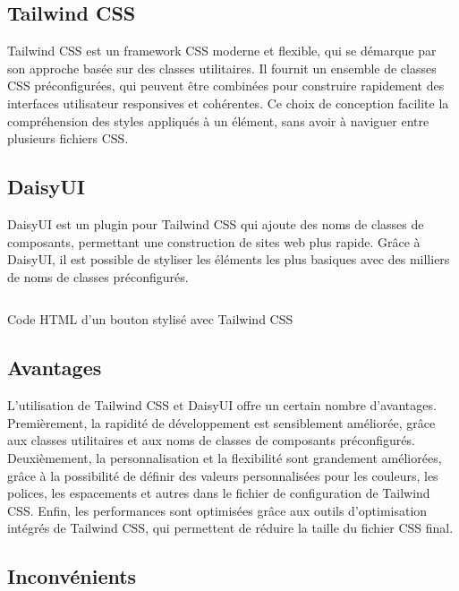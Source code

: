\subsection{Tailwind CSS}

Tailwind CSS est un framework CSS moderne et flexible, qui se démarque par son approche basée sur des classes utilitaires. Il fournit un ensemble de classes CSS préconfigurées, qui peuvent être combinées pour construire rapidement des interfaces utilisateur responsives et cohérentes. Ce choix de conception facilite la compréhension des styles appliqués à un élément, sans avoir à naviguer entre plusieurs fichiers CSS.

\subsection{DaisyUI}

DaisyUI est un plugin pour Tailwind CSS qui ajoute des noms de classes de composants, permettant une construction de sites web plus rapide. Grâce à DaisyUI, il est possible de styliser les éléments les plus basiques avec des milliers de noms de classes préconfigurés.

\begin{listing}[H]
    \inputminted{HTML}{assets/code/tailwind-example.html}
    \caption{Code HTML d'un bouton stylisé avec Tailwind CSS\label{fig:tailwind-example}}
\end{listing}

\subsection{Avantages}

L'utilisation de Tailwind CSS et DaisyUI offre un certain nombre d'avantages. Premièrement, la rapidité de développement est sensiblement améliorée, grâce aux classes utilitaires et aux noms de classes de composants préconfigurés. Deuxièmement, la personnalisation et la flexibilité sont grandement améliorées, grâce à la possibilité de définir des valeurs personnalisées pour les couleurs, les polices, les espacements et autres dans le fichier de configuration de Tailwind CSS. Enfin, les performances sont optimisées grâce aux outils d'optimisation intégrés de Tailwind CSS, qui permettent de réduire la taille du fichier CSS final.

\subsection{Inconvénients}

